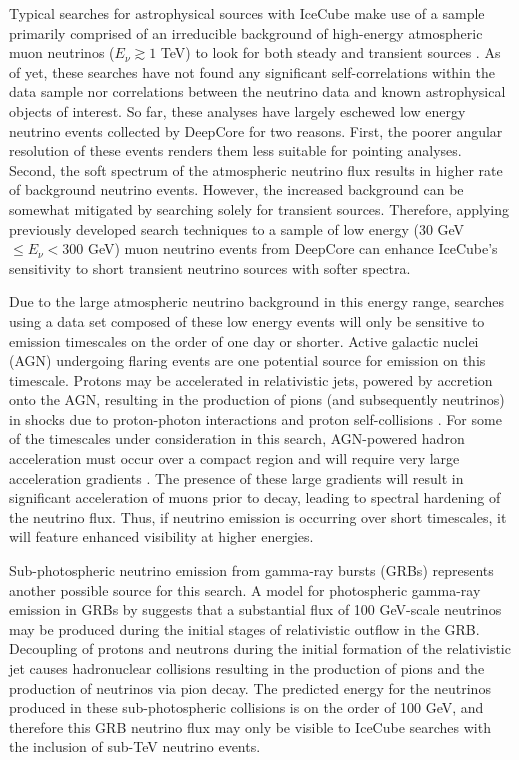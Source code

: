 \documentclass[manuscript]{aastex}
\begin{document}
Typical searches for astrophysical sources with IceCube make use of a sample primarily comprised of an irreducible background of high-energy atmospheric muon neutrinos ($E_{\nu} \gtrsim 1$ TeV) to look for both steady \citep{2014ApJ...796..109A} and transient sources \citep{0004-637X-807-1-46}. As of yet, these searches have not found any significant self-correlations within the data sample nor correlations between the neutrino data and known astrophysical objects of interest. So far, these analyses have largely eschewed low energy neutrino events collected by DeepCore for two reasons. First, the poorer angular resolution of these events renders them less suitable for pointing analyses. Second, the soft spectrum of the atmospheric neutrino flux results in higher rate of background neutrino events. However, the increased background can be somewhat mitigated by searching solely for transient sources. Therefore, applying previously developed search techniques \citep{2010APh....33..175B} to a sample of low energy (30 GeV $\leq E_{\nu} < 300$ GeV) muon neutrino events from DeepCore can enhance IceCube's sensitivity to short transient neutrino sources with softer spectra.

Due to the large atmospheric neutrino background in this energy range, searches using a data set composed of these low energy events will only be sensitive to emission timescales on the order of one day or shorter. Active galactic nuclei (AGN) undergoing flaring events are one potential source for emission on this timescale. Protons may be accelerated in relativistic jets, powered by accretion onto the AGN, resulting in the production of pions (and subsequently neutrinos) in shocks due to proton-photon interactions and proton self-collisions \citep{2009APh....31..138B}. For some of the timescales under consideration in this search, AGN-powered hadron acceleration must occur over a compact region and will require very large acceleration gradients \citep{2013ApJ...779..106K}. The presence of these large gradients will result in significant acceleration of muons prior to decay, leading to spectral hardening of the neutrino flux. Thus, if neutrino emission is occurring over short timescales, it will feature enhanced visibility at higher energies.

Sub-photospheric neutrino emission from gamma-ray bursts (GRBs) represents another possible source for this search. A model for photospheric gamma-ray emission in GRBs by \cite{2013PhRvL.111m1102M} suggests that a substantial flux of 100 GeV-scale neutrinos may be produced during the initial stages of relativistic outflow in the GRB. Decoupling of protons and neutrons during the initial formation of the relativistic jet causes hadronuclear collisions resulting in the production of pions and the production of neutrinos via pion decay. The predicted energy for the neutrinos produced in these sub-photospheric collisions is on the order of 100 GeV, and therefore this GRB neutrino flux may only be visible to IceCube searches with the inclusion of sub-TeV neutrino events. 
\end{document}
